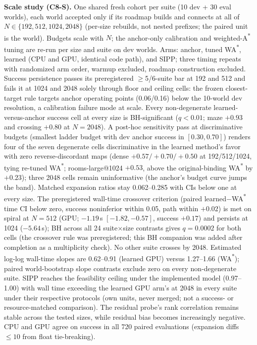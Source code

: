 \documentclass[letterpaper]{article} %
\begin{document}
\textbf{Scale study (C8-S).} One shared fresh cohort per suite (10 dev +
30 eval worlds), each world accepted only if its roadmap builds and
connects at all of $N \in \{192, 512, 1024, 2048\}$ (per-size rebuilds,
not nested prefixes; the paired unit is the world). Budgets scale with
$N$; the anchor-only calibration and weighted-A\textsuperscript{*} tuning
are re-run per size and suite on dev worlds. Arms: anchor, tuned
WA\textsuperscript{*}, learned (CPU and GPU, identical code path), and
SIPP; three timing repeats with randomized arm order, warmup excluded,
roadmap construction excluded. Success persistence passes its
preregistered $\geq$5/6-suite bar at 192 and 512 and fails it at 1024 and
2048 solely through floor and ceiling cells: the frozen closest-target
rule targets anchor operating points (0.06/0.16) below the 10-world dev
resolution, a calibration failure mode at scale. Every non-degenerate
learned-versus-anchor success cell at every size is BH-significant
($q<0.01$; maze $+0.93$ and crossing $+0.80$ at $N{=}2048$). A post-hoc sensitivity pass at discriminative
budgets (smallest ladder budget with dev anchor success in $[0.30,
0.70]$) renders four of the seven degenerate cells discriminative in the learned method's
favor with zero reverse-discordant maps (dense $+0.57/+0.70/+0.50$ at
192/512/1024, tying re-tuned WA\textsuperscript{*}; rooms-large@1024
$+0.53$, above the original-binding WA\textsuperscript{*} by $+0.23$);
three 2048 cells remain uninformative (the anchor's budget curve jumps
the band). Matched expansion ratios stay 0.062--0.285 with CIs below one
at every size. The preregistered wall-time crossover criterion (paired
learned$-$WA\textsuperscript{*} time CI below zero, success noninferior
within 0.05, path within $+0.02$) is met on spiral at $N{=}512$ (GPU;
$-1.19$\,s $[-1.82,-0.57]$, success $+0.17$) and persists at 1024
($-5.64$\,s); BH across all 24 suite$\times$size contrasts gives
$q{=}0.0002$ for both cells (the crossover rule was preregistered;
this BH companion was added after completion as a multiplicity
check). No other suite crosses by 2048. Estimated
log-log wall-time slopes are 0.62--0.91 (learned GPU) versus 1.27--1.66
(WA\textsuperscript{*}); paired world-bootstrap slope contrasts exclude
zero on every non-degenerate suite. SIPP reaches the feasibility ceiling under the implemented model
(0.97--1.00) with wall time exceeding the learned GPU arm's at 2048 in
every suite under their respective protocols (own units, never merged;
not a success- or resource-matched comparison). The residual probe's rank correlation remains stable across the
tested sizes, while residual bias becomes increasingly negative. CPU and GPU
agree on success in all 720 paired evaluations (expansion diffs
$\leq 10$ from float tie-breaking).
\end{document}
